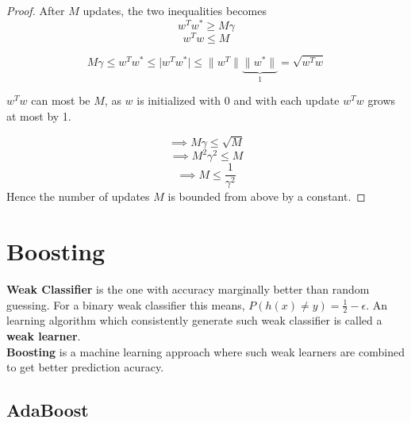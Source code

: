 \documentclass[12pt]{article}
\begin{document}
\begin{proof}
     
     \cleardoublepage
     
     After $M$ updates, the two inequalities becomes $$w^{T}w^{*} \geq M\gamma$$  $$w^{T}w \leq M$$
 
 $$M\gamma \leq w^{T}w^{*} \leq \vert w^{T}w^{*} \vert \leq \| w^{T} \| \underbrace{\|w^{*}\|}_\text{1}=\sqrt{w^{T}w}$$
 
 $w^{T}w$ can most be $M$, as $w$ is initialized with 0 and with each update $w^{T}w$ grows at most by 1.
 
 $$\implies M\gamma \leq \sqrt{M} $$
 $$\implies M^{2}\gamma^{2} \leq M$$
 $$\implies M \leq \frac{1}{\gamma ^{2}}$$  Hence the number of updates $M$ is bounded from above by a constant.
  
 
 	
 \end{proof}
 
 \section*{Boosting}
 \textbf{Weak Classifier} is the one with accuracy marginally better than random guessing. For a binary  weak classifier this means, $P(h(x) \neq y) = \frac{1}{2} - \epsilon .$ An learning algorithm which consistently generate such weak classifier is called a \textbf{weak learner}.\\ \textbf{Boosting} is a machine learning approach where such weak learners are combined to get better prediction acuracy.\\


\cleardoublepage

 \subsection*{AdaBoost}
 
\end{document}
